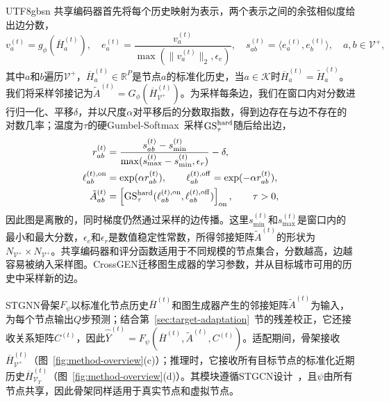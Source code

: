 \documentclass[runningheads,a4paper]{llncs}
\begin{document}
\begin{CJK*}{UTF8}{gbsn}
共享编码器首先将每个历史映射为表示，两个表示之间的余弦相似度给出边分数，
\begin{equation}
  v_a^{(t)}=g_\phi(\overline H_a^{(t)}),\quad e_a^{(t)}=\frac{v_a^{(t)}}{\max(\|v_a^{(t)}\|_2,\epsilon_e)},\quad
  s_{ab}^{(t)}=\langle e_a^{(t)},e_b^{(t)}\rangle,\quad a,b\in\mathcal V^{+} ,
  \label{eq:graph-history-scores}
\end{equation}
其中$a$和$b$遍历$\mathcal V^{+}$，$\overline H_a^{(t)}\in\mathbb R^{P}$是节点$a$的标准化历史，当$a\in\mathcal K$时$\overline H_a^{(t)}=\widetilde H_a^{(t)}$。我们将采样邻接记为$\tilde A^{(t)}=G_\phi(\overline H_{\mathcal V^{+}}^{(t)})$。为采样每条边，我们在窗口内对分数进行归一化、平移$\delta$，并以尺度$\alpha$对平移后的分数取指数，得到边存在与边不存在的对数几率；温度为$\tau$的硬Gumbel-Softmax~\cite{gumbel}采样$\operatorname{GS}^{\rm hard}_{\tau}$随后给出边，
\begin{equation}
\begin{aligned}
  r_{ab}^{(t)}&=\frac{s_{ab}^{(t)}-s_{\min}^{(t)}}{\max(s_{\max}^{(t)}-s_{\min}^{(t)},\epsilon_r)}-\delta,\\
  \ell_{ab}^{(t),\rm on}&=\exp(\alpha r_{ab}^{(t)}),\qquad
  \ell_{ab}^{(t),\rm off}=\exp(-\alpha r_{ab}^{(t)}),\\
  \tilde A_{ab}^{(t)}&=\left[\operatorname{GS}^{\rm hard}_{\tau}(\ell_{ab}^{(t),\rm on},\ell_{ab}^{(t),\rm off})\right]_{\rm on},
  \qquad \tau>0 ,
\end{aligned}
  \label{eq:sparse-graph}
\end{equation}
因此图是离散的，同时梯度仍然通过采样的边传播。这里$s_{\min}^{(t)}$和$s_{\max}^{(t)}$是窗口内的最小和最大分数，$\epsilon_e$和$\epsilon_r$是数值稳定性常数，所得邻接矩阵$\tilde A^{(t)}$的形状为$N_{\mathcal V^{+}}\times N_{\mathcal V^{+}}$。共享编码器和评分函数适用于不同规模的节点集合，分数越高，边越容易被纳入采样图。CrossGEN迁移图生成器的学习参数，并从目标城市可用的历史中采样新的边。

STGNN骨架$F_\psi$以标准化节点历史$\overline H^{(t)}$和图生成器产生的邻接矩阵$\tilde A^{(t)}$为输入，为每个节点输出$Q$步预测；结合第~\ref{sec:target-adaptation}~节的残差校正，它还接收关系矩阵$C^{(t)}$，因此$\widehat{\overline Y}^{(t)}=F_\psi(\overline H^{(t)},\tilde A^{(t)},C^{(t)})$。适配期间，骨架接收$\overline H_{\mathcal V^{+}}^{(t)}$（图~\ref{fig:method-overview}(c)）；推理时，它接收所有目标节点的标准化近期历史$\overline H_{\mathcal V_T}^{(t)}$（图~\ref{fig:method-overview}(d)）。其模块遵循STGCN设计~\cite{stgcn}，且$\psi$由所有节点共享，因此骨架同样适用于真实节点和虚拟节点。


\end{CJK*}
\end{document}
